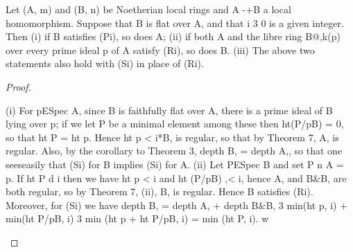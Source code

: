 \begin{theorem}[Theorem 23.9]\label{mcrt-auto-theorem-23-9}\uses{}
\begin{mathematicalrecord}
Let (A, m) and (B, n) be Noetherian local rings and A -+B
a local homomorphism.         Suppose that B is flat over A, and that i 3 0 is a
given integer. Then
   (i) if B satisfies (Pi), so does A;
    (ii) if both A and the libre ring B@,k(p) over every prime ideal p of
A satisfy (Ri), so does B.
   (iii) The above two statements also hold with (Si) in place of (Ri).
\end{mathematicalrecord}
\end{theorem}
\begin{proof}
\begin{mathematicalrecord}
(i) For pESpec A, since B is faithfully flat over A, there is a prime
ideal of B lying over p; if we let P be a minimal element among these
then ht(P/pB) = 0, so that ht P = ht p. Hence ht p < i*B,          is regular, so
that by Theorem 7, A, is regular. Also, by the corollary to Theorem 3,
depth B, = depth A,, so that one seeseasily that (Si) for B implies (Si) for A.
   (ii) Let PESpec B and set P n A = p. If ht P d i then we have ht p < i
and ht (P/pB) ,< i, hence A, and B&B,         are both regular, so by Theorem
7, (ii), B, is regular. Hence B satisfies (Ri). Moreover, for (Si) we have
            depth B, = depth A, + depth B&B,
                      3 min(ht p, i) + min(ht P/pB, i)
                      3 min (ht p + ht P/pB, i) = min (ht P, i). w
\end{mathematicalrecord}
\end{proof}


